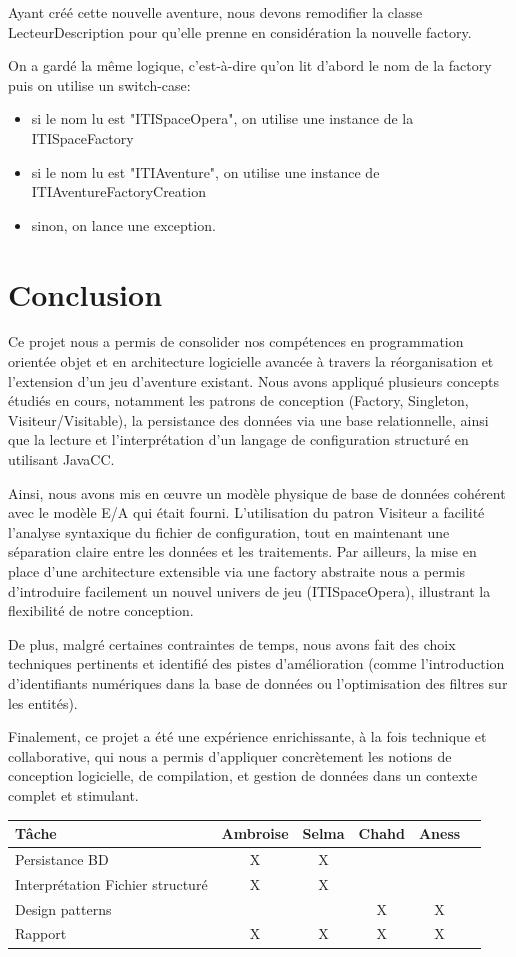 \documentclass[12pt,a4paper]{report}
\begin{document}
Ayant créé cette nouvelle aventure, nous devons remodifier la classe LecteurDescription pour qu'elle prenne en considération la nouvelle factory.

On a gardé la même logique, c'est-à-dire qu'on lit d'abord le nom de la factory puis on utilise un switch-case:
\begin{itemize}
\item si le nom lu est "ITISpaceOpera", on utilise une instance de la ITISpaceFactory
\item si le nom lu est "ITIAventure", on utilise une instance de ITIAventureFactoryCreation
\item sinon, on lance une exception.


\end{itemize}

\chapter*{Conclusion}

Ce projet nous a permis de consolider nos compétences en programmation orientée objet et en architecture logicielle avancée à travers la réorganisation et l’extension d’un jeu d’aventure existant. Nous avons appliqué plusieurs concepts étudiés en cours, notamment les patrons de conception (Factory, Singleton, Visiteur/Visitable), la persistance des données via une base relationnelle, ainsi que la lecture et l’interprétation d’un langage de configuration structuré en utilisant JavaCC.

Ainsi, nous avons mis en œuvre un modèle physique de base de données cohérent avec le modèle E/A qui était fourni. L'utilisation du patron Visiteur a facilité l'analyse syntaxique du fichier de configuration, tout en maintenant une séparation claire entre les données et les traitements. Par ailleurs, la mise en place d’une architecture extensible via une factory abstraite nous a permis d’introduire facilement un nouvel univers de jeu (ITISpaceOpera), illustrant la flexibilité de notre conception.

De plus, malgré certaines contraintes de temps, nous avons fait des choix techniques pertinents et identifié des pistes d’amélioration (comme l’introduction d’identifiants numériques dans la base de données ou l’optimisation des filtres sur les entités). 

Finalement, ce projet a été une expérience enrichissante, à la fois technique et collaborative, qui nous a permis d’appliquer concrètement les notions de conception logicielle, de compilation, et gestion de données dans un contexte complet et stimulant.

\begin{center}
\begin{tabular}{|l|c|c|c|c|c|}
\hline
\textbf{Tâche} & \textbf{Ambroise} & \textbf{Selma} & \textbf{Chahd} & \textbf{Aness} \\
\hline
Persistance BD & X &  X & &  \\
Interprétation Fichier structuré & X & X  &  &  \\
Design patterns & & &  X & X \\
Rapport & X & X & X & X \\
\hline
\end{tabular}
\end{center}
\end{document}
